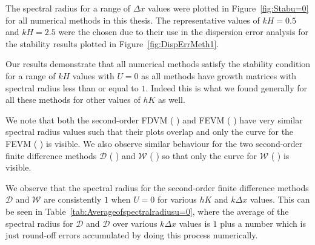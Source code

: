 The spectral radius for a range of $\Delta x$ values were plotted in Figure~\ref{fig:Stabu=0} for all numerical methods in this thesis. The representative values of $kH =0.5$ and $kH = 2.5$ were the chosen due to their use in the dispersion error analysis for the stability results plotted in Figure~\ref{fig:DispErrMeth1}.

Our results demonstrate that all numerical methods satisfy the stability condition for a range of $kH$ values with $U=0$ as all methods have growth matrices with spectral radius less than or equal to $1$. Indeed this is what we found generally for all these methods for other values of $hK$ as well.

We note that both the second-order FDVM ({\color{red} \solidrule}) and FEVM ({\color{blue} \solidrule}) have very similar spectral radius values such that their plots overlap and only the curve for the FEVM ({\color{blue} \solidrule}) is visible. We also observe similar behaviour for the two second-order finite difference methods $\mathcal{D}$ ({\color{violet!80!white} \solidrule}) and $\mathcal{W}$ ({\color{orange} \solidrule}) so that only the curve for $\mathcal{W}$ ({\color{orange} \solidrule}) is visible.

We observe that the spectral radius for the second-order finite difference methods $\mathcal{D}$ and $\mathcal{W}$ are consistently $1$ when $U=0$ for various $hK$ and $
k\Delta x$ values. This can be seen in Table~\ref{tab:Averageofspectralradiusu=0}, where the average of the spectral radius for $\mathcal{D}$ and $\mathcal{D}$ over various $k \Delta x$ values is $1$ plus a number which is just round-off errors accumulated by doing this process numerically.

